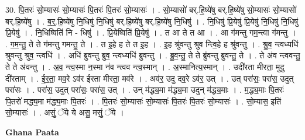 \documentclass[17pt]{extarticle}
\begin{document}
30. पि॒तरः॑ सो॒म्यासः॑ सो॒म्यासः॑ पि॒तरः॑ पि॒तरः॑ सो॒म्यासः॑ । . सो॒म्यासो॑ बर्.हि॒ष्ये॑षु बर्.हि॒ष्ये॑षु सो॒म्यासः॑ सो॒म्यासो॑ बर्.हि॒ष्ये॑षु । . ब॒र्॒.हि॒ष्ये॑षु नि॒धिषु॑ नि॒धिषु॑ बर्.हि॒ष्ये॑षु बर्.हि॒ष्ये॑षु नि॒धिषु॑ । . नि॒धिषु॑ प्रि॒येषु॑ प्रि॒येषु॑ नि॒धिषु॑ नि॒धिषु॑ प्रि॒येषु॑ । . नि॒धिष्विति॑ नि - धिषु॑ । . प्रि॒येष्विति॑ प्रि॒येषु॑ । . त आ ते त आ । . आ ग॑मन्तु गम॒न्त्वा ग॑मन्तु । . ग॒म॒न्तु॒ ते ते ग॑मन्तु गमन्तु॒ ते । . त इ॒हे ह ते त इ॒ह । . इ॒ह श्रु॑वन्तु श्रुव न्त्वि॒हे ह श्रु॑वन्तु । . श्रु॒व॒ न्त्वध्यधि॑ श्रुवन्तु श्रुव॒ न्त्वधि॑ । . अधि॑ ब्रुवन्तु ब्रुव॒ न्त्वध्यधि॑ ब्रुवन्तु । . ब्रु॒व॒न्तु॒ ते ते ब्रु॑वन्तु ब्रुवन्तु॒ ते । . ते अ॑व न्त्ववन्तु॒ ते ते अ॑वन्तु । . अ॒व॒ न्त्व॒स्मा न॒स्मा न॑व न्त्वव न्त्व॒स्मान् । . अ॒स्मानित्य॒स्मान् । . उदी॑रता मीरता॒ मुदु दी॑रताम् । . ई॒र॒ता॒ मव॒रे ऽव॑र ईरता मीरता॒ मव॑रे । . अव॑र॒ उदु दव॒रे ऽव॑र॒ उत् । . उत् परा॑सः॒ परा॑स॒ उदुत् परा॑सः । . परा॑स॒ उदुत् परा॑सः॒ परा॑स॒ उत् । . उन् म॑द्ध्य॒मा म॑द्ध्य॒मा उदुन् म॑द्ध्य॒माः । . म॒द्ध्य॒माः पि॒तरः॑ पि॒तरो॑ मद्ध्य॒मा म॑द्ध्य॒माः पि॒तरः॑ । . पि॒तरः॑ सो॒म्यासः॑ सो॒म्यासः॑ पि॒तरः॑ पि॒तरः॑ सो॒म्यासः॑ । . सो॒म्यास॒ इति॑ सो॒म्यासः॑ । . असुं॒ ॅये ये असु॒ मसुं॒ ॅये । \newline

\textbf{Ghana Paata } \newline
\end{document}
